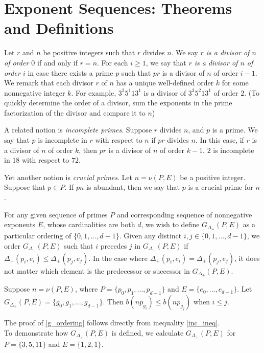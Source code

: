 \documentclass[../paper.tex]{subfiles}
\begin{document}
\section{Exponent Sequences: Theorems and Definitions}

Let $r$ and $n$ be positive integers such that $r$ divides $n$. We
say \textit{$r$ is a divisor of $n$ of order $0$} if and only if $r = n$.
For each $i \geq 1$, we say that \textit{$r$ is a divisor of $n$ of order
$i$} in case there exists a prime $p$ such that $pr$ is a divisor
of $n$ of order $i - 1$. We remark that each divisor $r$ of $n$ has a 
unique well-defined order $k$ for some nonnegative integer $k$. For example, 
$3^2 5^1 13^1$ is a divisor of $3^3 5^2 13^1$ of order $2$. (To quickly 
determine the order of a divisor, sum the exponents in the prime 
factorization of the divisor and compare it to $n$)

A related notion is \textit{incomplete primes}. Suppose $r$ divides 
$n$, and $p$ is a prime. We say that $p$ is incomplete in $r$ with 
respect to $n$ if $pr$ divides $n$. In this case, if $r$ is a divisor 
of $n$ of order $k$, then $pr$ is a divisor of $n$ of order $k - 1$.
$2$ is incomplete in $18$ with respect to $72$.

Yet another notion is \textit{crucial primes}. Let $n = \nu (P,E)$ 
be a positive integer. Suppose that $p \in P$. If $pn$ is
abundant, then we say that $p$ is a crucial prime for $n$. 

For any given sequence of primes $P$ and corresponding sequence of
nonnegative exponents $E$, whose cardinalities are both $d$, we
wish to define $G_{\Delta_+}(P,E)$ as a particular ordering of
$\{0, 1, ..., d-1\}$. Given any distinct $i,j \in \{0, 1, ..., 
d - 1\}$, we order $G_{\Delta_+}(P, E)$ such that $i$ precedes 
$j$ in $G_{\Delta_+}(P, E)$ if $\Delta_+(p_i, e_i) \leq 
\Delta_+(p_j, e_j)$. In the case where  $\Delta_+(p_i, e_i) =
\Delta_+(p_j, e_j)$, it does not matter which element is the
predecessor or successor in $G_{\Delta_+}(P,E)$.

\begin{theorem}\label{g_ordering}
Suppose $n = \nu(P, E)$, where $P = \{p_0, p_1, ..., p_{d-1}\}$
and $E = \{e_0, ..., e_{d-1}\}$. Let $G_{\Delta_+}(P,E) = \{g_0, 
g_1, ..., g_{d-1}\}$. Then $b(n p_{g_i}) \leq b(n p_{g_j})$ when $i \leq j$.
\end{theorem}

The proof of {\ref{g_ordering}} follows directly from inequality
\ref{inc_ineq}.
\\
To demonstrate how $G_{\Delta_+}(P,E)$ is defined, we calculate
$G_{\Delta_+}(P,E)$ for $P = \{3, 5, 11\}$ and $E = \{1, 2, 1\}$.
\end{document}
